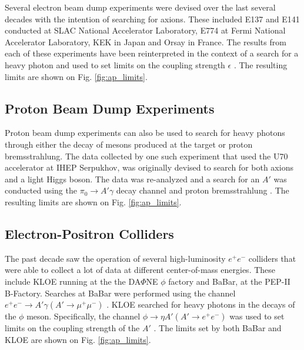 Several electron beam dump experiments were devised over the last several decades with
the intention of searching for axions.  These included E137 \cite{bjorken1988}
and E141 \cite{riordan1987} conducted at SLAC National Accelerator Laboratory,
E774 \cite{bross1991} at Fermi National Accelerator Laboratory, 
KEK \cite{konaka1986} in Japan and Orsay \cite{davier1989} in France. 
The results from each of these experiments have been reinterpreted in the 
context of a search for a heavy photon and used to set limits on the coupling
strength $\epsilon$ \cite{Bjorken:2009mm, andreas2012}.  The resulting limits are 
shown on Fig. \ref{fig:ap_limits}.

\subsection{Proton Beam Dump Experiments}

Proton beam dump experiments can also be used to search for heavy photons
through either the decay of mesons produced at the target or proton
bremsstrahlung.  The data collected by one such experiment that used the U70
accelerator at IHEP Serpukhov, was originally devised to search for both axions
and a light Higgs boson.  The data was re-analyzed and a search for an $A'$ 
was conducted
using the $\pi_0 \rightarrow A'\gamma$ decay channel and proton bremsstrahlung
\cite{johannes2011, johannes2014}. The resulting limits are shown on Fig. 
\ref{fig:ap_limits}.

\subsection{Electron-Positron Colliders}

The past decade saw the operation of several high-luminosity $e^+e^-$ colliders 
that were able to collect a lot of data at different center-of-mass energies.
These include KLOE running at the the DA$\Phi$NE $\phi$ factory and BaBar, 
at the PEP-II B-Factory. Searches at BaBar were performed using the channel 
$e^+e^- \rightarrow A' \gamma (A' \rightarrow \mu^+\mu^-)$ 
\cite{Reece:2009un, Aubert:2009cp}.  KLOE 
searched for heavy photons in the decays of the $\phi$ meson.  Specifically, 
the channel $\phi \rightarrow \eta A' (A' \rightarrow e^+e^-)$ was used to
set limits on the coupling strength of the $A'$ 
\cite{Babusci:2012cr, Archilli:2011zc}.
The limits set by both BaBar and KLOE are shown on Fig. \ref{fig:ap_limits}.

